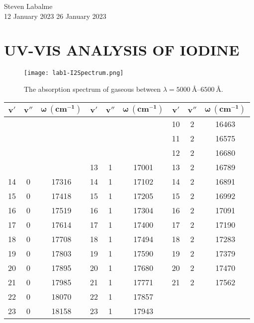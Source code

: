 \documentclass[../labs.tex]{subfiles}
\begin{document}
\noindent Steven Labalme\\
12 January 2023\hfill
26 January 2023

\section{UV-VIS ANALYSIS OF IODINE}
\begin{figure}[H]
    \centering
    \texttt{[image: lab1-I2Spectrum.png]}
    \caption{The absorption spectrum of gaseous  between $\lambda=\SIrange{5000}{6500}{\angstrom}$.}
    \label{fig:I2Spectrum}
\end{figure}

\begin{table}[H]
    \centering
    \small
    \renewcommand{\arraystretch}{1.2}
    \begin{tabular}{|c|c|c|c|c|c|c|c|c|}
        \hline
        $\bm{v'}$ & $\bm{v''}$ & $\bm{\omega\ (\textbf{cm}^{-1})}$ & $\bm{v'}$ & $\bm{v''}$ & $\bm{\omega\ (\textbf{cm}^{-1})}$ & $\bm{v'}$ & $\bm{v''}$ & $\bm{\omega\ (\textbf{cm}^{-1})}$\\
        \hline
           &   &       &    &   &       & 10 & 2 & 16463\\ \hline
           &   &       &    &   &       & 11 & 2 & 16575\\ \hline
           &   &       &    &   &       & 12 & 2 & 16680\\ \hline
           &   &       & 13 & 1 & 17001 & 13 & 2 & 16789\\ \hline
        14 & 0 & 17316 & 14 & 1 & 17102 & 14 & 2 & 16891\\ \hline
        15 & 0 & 17418 & 15 & 1 & 17205 & 15 & 2 & 16992\\ \hline
        16 & 0 & 17519 & 16 & 1 & 17304 & 16 & 2 & 17091\\ \hline
        17 & 0 & 17614 & 17 & 1 & 17400 & 17 & 2 & 17190\\ \hline
        18 & 0 & 17708 & 18 & 1 & 17494 & 18 & 2 & 17283\\ \hline
        19 & 0 & 17803 & 19 & 1 & 17590 & 19 & 2 & 17379\\ \hline
        20 & 0 & 17895 & 20 & 1 & 17680 & 20 & 2 & 17470\\ \hline
        21 & 0 & 17985 & 21 & 1 & 17771 & 21 & 2 & 17562\\ \hline
        22 & 0 & 18070 & 22 & 1 & 17857 &    &   &      \\ \hline
        23 & 0 & 18158 & 23 & 1 & 17943 &    &   &      \\ \hline

\end{tabular}
\end{table}
\end{document}
